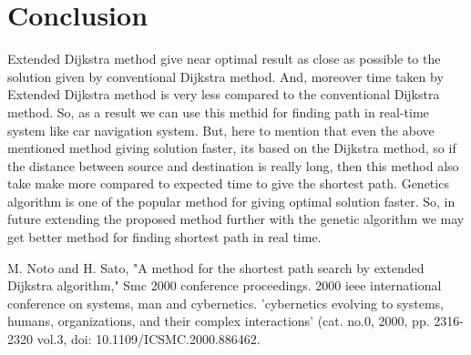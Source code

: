 \documentclass[conference]{IEEEtran}
\begin{document}
\vspace{12pt}
\section{Conclusion}
Extended Dijkstra method give near optimal result as close as possible to the solution given by conventional Dijkstra method. And, moreover time taken by Extended Dijkstra method is very less compared to the conventional Dijkstra method. So, as a result we can use this methid for finding path in real-time system like car navigation system. But, here to mention that even the above mentioned method giving solution faster, its based on the Dijkstra method, so if the distance between source and destination is really long, then this method also take make more compared to expected time to give the shortest path. Genetics algorithm is one of the popular method for giving optimal solution faster. So, in future extending the proposed method further with the genetic algorithm we may get better method for finding shortest path in real time.


\vspace{12pt}
\begin{thebibliography}{00}
 M. Noto and H. Sato, "A method for the shortest path search by extended Dijkstra algorithm," Smc 2000 conference proceedings. 2000 ieee international conference on systems, man and cybernetics. 'cybernetics evolving to systems, humans, organizations, and their complex interactions' (cat. no.0, 2000, pp. 2316-2320 vol.3, doi: 10.1109/ICSMC.2000.886462.

\end{thebibliography}
\end{document}
